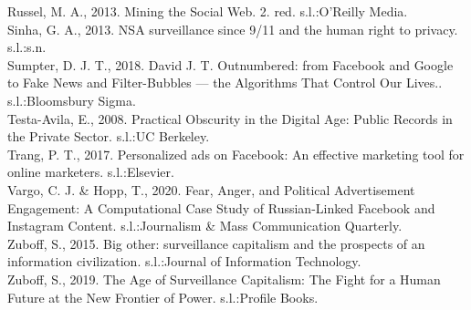 \documentclass[11pt]{article}
\begin{document}
Russel, M. A., 2013. Mining the Social Web. 2. red. s.l.:O'Reilly Media. \\

Sinha, G. A., 2013. NSA surveillance since 9/11 and the human right to privacy. s.l.:s.n.\\ 

Sumpter, D. J. T., 2018. David J. T. Outnumbered: from Facebook and Google to Fake News and Filter-Bubbles — the Algorithms That Control Our Lives.. s.l.:Bloomsbury Sigma. \\

Testa-Avila, E., 2008. Practical Obscurity in the Digital Age: Public Records in the Private Sector. s.l.:UC Berkeley. \\

Trang, P. T., 2017. Personalized ads on Facebook: An effective marketing tool for online marketers. s.l.:Elsevier. \\

Vargo, C. J. \& Hopp, T., 2020. Fear, Anger, and Political Advertisement Engagement: A Computational Case Study of Russian-Linked Facebook and Instagram Content. s.l.:Journalism \& Mass Communication Quarterly. \\

Zuboff, S., 2015. Big other: surveillance capitalism and the prospects of an information civilization. s.l.:Journal of Information Technology. \\

Zuboff, S., 2019. The Age of Surveillance Capitalism: The Fight for a Human Future at the New Frontier of Power. s.l.:Profile Books. \\
\end{document}
